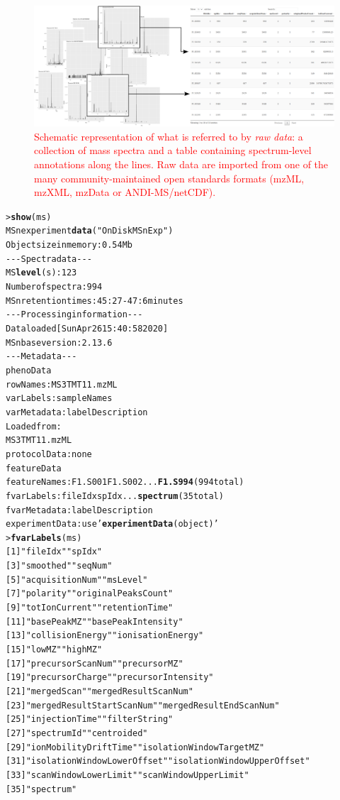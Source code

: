 \documentclass[journal=jacsat,manuscript=article]{achemso}\usepackage[]{graphicx}\usepackage[]{color}
\makeatletter
\newcommand{\hlstr}[1]{\textcolor[rgb]{0.192,0.494,0.8}{#1}}%
\newcommand{\hlkwd}[1]{\textcolor[rgb]{0.737,0.353,0.396}{\textbf{#1}}}%
\newenvironment{kframe}{%
 \def\at@end@of@kframe{}%
 \ifinner\ifhmode%
  \def\at@end@of@kframe{\end{minipage}}%
  \begin{minipage}{\columnwidth}%
 \fi\fi%
 \def\FrameCommand##1{\hskip\@totalleftmargin \hskip-\fboxsep
 \colorbox{shadecolor}{##1}\hskip-\fboxsep
     \hskip-\linewidth \hskip-\@totalleftmargin \hskip\columnwidth}%
 \MakeFramed {\advance\hsize-\width
   \@totalleftmargin\z@ \linewidth\hsize
   \@setminipage}}%
 {\par\unskip\endMakeFramed%
 \at@end@of@kframe}
\newenvironment{knitrout}{}{} %
\makeatother
\begin{document}
\begin{figure}
  \centering
  \includegraphics[width=0.8\linewidth]{./figure/raw.png}
  \caption{\textcolor{red}{Schematic representation of what is
      referred to by \textit{raw data}: a collection of mass spectra
      and a table containing spectrum-level annotations along the
      lines. Raw data are imported from one of the many
      community-maintained open standards formats (mzML, mzXML, mzData
      or ANDI-MS/netCDF).} }
  \label{fig:raw}
\end{figure}


\begin{knitrout}
\color{fgcolor}\begin{kframe}
\begin{alltt}
> \hlkwd{show}(ms)
MSn experiment \hlkwd{data} (\hlstr{"OnDiskMSnExp"})
Object size in memory: 0.54 Mb
- - - Spectra data - - -
 MS \hlkwd{level}(s): 1 2 3
 Number of spectra: 994
 MSn retention times: 45:27 - 47:6 minutes
- - - Processing information - - -
Data loaded [Sun Apr 26 15:40:58 2020]
 MSnbase version: 2.13.6
- - - Meta data  - - -
phenoData
  rowNames: MS3TMT11.mzML
  varLabels: sampleNames
  varMetadata: labelDescription
Loaded from:
  MS3TMT11.mzML
protocolData: none
featureData
  featureNames: F1.S001 F1.S002 ... \hlkwd{F1.S994} (994 total)
  fvarLabels: fileIdx spIdx ... \hlkwd{spectrum} (35 total)
  fvarMetadata: labelDescription
experimentData: use \hlstr{'\hlkwd{experimentData}(object)'}
> \hlkwd{fvarLabels}(ms)
 [1] \hlstr{"fileIdx"}                    \hlstr{"spIdx"}
 [3] \hlstr{"smoothed"}                   \hlstr{"seqNum"}
 [5] \hlstr{"acquisitionNum"}             \hlstr{"msLevel"}
 [7] \hlstr{"polarity"}                   \hlstr{"originalPeaksCount"}
 [9] \hlstr{"totIonCurrent"}              \hlstr{"retentionTime"}
[11] \hlstr{"basePeakMZ"}                 \hlstr{"basePeakIntensity"}
[13] \hlstr{"collisionEnergy"}            \hlstr{"ionisationEnergy"}
[15] \hlstr{"lowMZ"}                      \hlstr{"highMZ"}
[17] \hlstr{"precursorScanNum"}           \hlstr{"precursorMZ"}
[19] \hlstr{"precursorCharge"}            \hlstr{"precursorIntensity"}
[21] \hlstr{"mergedScan"}                 \hlstr{"mergedResultScanNum"}
[23] \hlstr{"mergedResultStartScanNum"}   \hlstr{"mergedResultEndScanNum"}
[25] \hlstr{"injectionTime"}              \hlstr{"filterString"}
[27] \hlstr{"spectrumId"}                 \hlstr{"centroided"}
[29] \hlstr{"ionMobilityDriftTime"}       \hlstr{"isolationWindowTargetMZ"}
[31] \hlstr{"isolationWindowLowerOffset"} \hlstr{"isolationWindowUpperOffset"}
[33] \hlstr{"scanWindowLowerLimit"}       \hlstr{"scanWindowUpperLimit"}
[35] \hlstr{"spectrum"}
\end{alltt}
\end{kframe}
\end{knitrout}
\end{document}
